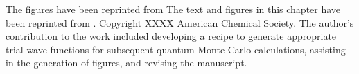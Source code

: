 The figures have been reprinted from \cite{Hao2018}
The text and figures in this chapter have been reprinted from \cite{Hao2018}.
Copyright XXXX American Chemical Society. %
The author's contribution to the work included developing a recipe to generate appropriate trial wave functions for subsequent quantum Monte Carlo calculations, assisting in the generation of figures, and revising the manuscript.
